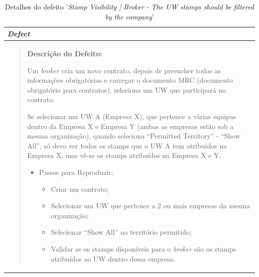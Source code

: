             \begin{table}[htbp] %
                \centering
                \caption{Detalhes do defeito '\textit{Stamp Visibility | Broker - The UW stamps should be filtered by the company}'}\label{table:defect2}
                \begin{tabularx}{1\textwidth}{|>{\raggedright\arraybackslash}X|}
                    \hline
                    \rowcolor{lightgray}
                    \textbf{\textit{Defect}} \\
                    \hline
                    \rowcolor{lightgray!20}
                  
                    \begin{quote}
                        \textbf{Descrição do Defeito:}
                    
                        Um \textit{broker} cria um novo contrato, depois de preencher todas as informações obrigatórias e carregar o documento MRC (documento obrigatório para contratos), seleciona um UW que participará no contrato.
    
                        Se selecionar um UW A (Empresa X), que pertence a várias equipas dentro da Empresa X e Empresa Y (ambas as empresas estão sob a mesma organização), quando seleciona ``Permitted Territory'' - ``Show All'', só devo ver todos os stamps que o UW A tem atribuídos na Empresa X, mas vê-se os stamps atribuídos na Empresa X e Y.
    
                        \begin{itemize}
                            \item Passos para Reproduzir:
                                \begin{itemize}
                                    \item Criar um contrato;
                                    \item Selecionar um UW que pertence a 2 ou mais empresas da mesma organização;
                                    \item Selecionar ``Show All'' no território permitido;
                                    \item Validar se os stamps disponíveis para o \textit{broker} são os stamps atribuídos ao UW dentro dessa empresa.
                                \end{itemize}
                        \end{itemize}
                    \end{quote}

                    \\
                    \hline
                \end{tabularx}
            \end{table}
            
